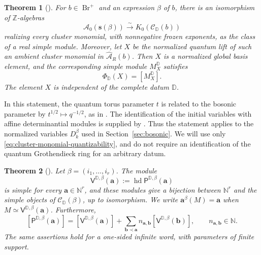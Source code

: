 \documentclass[12pt, reqno]{amsart}
\theoremstyle{plain}
\newtheorem{theorem}{Theorem}[section]
\theoremstyle{definition}
\numberwithin{equation}{section}
\newcommand{\ZZ}{\mathbb{Z}}
\newcommand{\NN}{\mathbb{N}}
\newcommand{\DD}{\mathbb{D}}
\newcommand{\bfa}{\mathbf{a}}
\newcommand{\cA}{\mathcal{A}}
\newcommand{\Br}{{\operatorname{Br}}}
\begin{document}
\begin{theorem}[{\cite[Theorems~9.4 and~9.7, Corollary~9.8]
{kashiwara2025monoidal}}]\label{theo:isoAb}
For \(b\in\Br^+\) and an expression \(\beta\) of \(b\), there is an
isomorphism of \(\ZZ\)-algebras
\[
\cA_0(\mathbf s(\beta))\xrightarrow{\sim}K_0(\mathscr C_{\DD}(b))
\]
realizing every cluster monomial, with nonnegative frozen exponents,
as the class of a real simple module.
Moreover, let \(X\) be the normalized quantum lift of such an ambient
cluster monomial in \(\widehat{\cA}_R(b)\). Then \(X\) is a normalized
global basis element, and the corresponding simple module \(M_X^{\DD}\)
satisfies
\begin{equation}\label{eq:cluster-monomial-quantizability}
\Phi_{\DD}(X)=[M_X^{\DD}].
\end{equation}
The element \(X\) is independent of the complete datum \(\DD\).
\end{theorem}

In this statement, the quantum torus parameter \(t\) is related to
the bosonic parameter by \(t^{1/2}\mapsto q^{-1/2}\), as in
\cite[Theorem~9.7]{kashiwara2025monoidal}. The identification of the
initial variables with affine determinantial modules is supplied by
\cite[Theorem~6.10]{kashiwara2025monoidal}. Thus the statement applies
to the normalized variables \(D_k^\beta\) used in
Section~\ref{sec:bosonic}. We will use only
\eqref{eq:cluster-monomial-quantizability}, and do not require an
identification of the quantum Grothendieck ring for an arbitrary datum.

\begin{theorem}[{\cite[Lemma~5.26, Theorem~5.28, and Proposition~5.33]
{kashiwara2025monoidal}}]\label{theo:Lusztigsim}
Let \(\beta=(i_1,\ldots,i_r)\). The module
\[
\mathsf V^{\DD,\beta}(\mathbf a):=
\operatorname{hd}\mathsf P^{\DD,\beta}(\mathbf a)
\]
is simple for every \(\mathbf a\in\NN^r\), and these modules give a
bijection between \(\NN^r\) and the simple objects of
\(\mathscr C_{\DD}(\beta)\), up to isomorphism. We write
\(\bfa^\beta(M)=\mathbf a\) when
\(M\simeq\mathsf V^{\DD,\beta}(\mathbf a)\).
Furthermore,
\begin{equation}\label{eq:categorical-PBW-triangularity}
[\mathsf P^{\DD,\beta}(\mathbf a)]
=[\mathsf V^{\DD,\beta}(\mathbf a)]
+\sum_{\mathbf b\prec\mathbf a}n_{\mathbf a,\mathbf b}
[\mathsf V^{\DD,\beta}(\mathbf b)],
\qquad n_{\mathbf a,\mathbf b}\in\NN.
\end{equation}
The same assertions hold for a one-sided infinite word, with parameters
of finite support.
\end{theorem}
\end{document}
